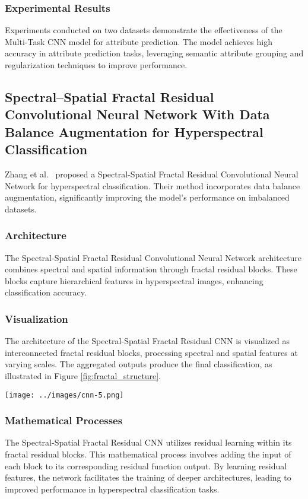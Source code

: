 \documentclass[journal, biblatex]{IEEEtran}
\begin{document}
\subsubsection{Experimental Results}
Experiments conducted on two datasets demonstrate the effectiveness of the Multi-Task CNN model for attribute prediction. The model achieves high accuracy in attribute prediction tasks, leveraging semantic attribute grouping and regularization techniques to improve performance.


\subsection{Spectral–Spatial Fractal Residual Convolutional Neural Network With Data Balance Augmentation for Hyperspectral Classification}
Zhang et al.~\cite{zhang2021} proposed a Spectral-Spatial Fractal Residual Convolutional Neural Network for hyperspectral classification. Their method incorporates data balance augmentation, significantly improving the model's performance on imbalanced datasets.

\subsubsection{Architecture}
The Spectral-Spatial Fractal Residual Convolutional Neural Network architecture combines spectral and spatial information through fractal residual blocks. These blocks capture hierarchical features in hyperspectral images, enhancing classification accuracy.

\subsubsection{Visualization}
The architecture of the Spectral-Spatial Fractal Residual CNN is visualized as interconnected fractal residual blocks, processing spectral and spatial features at varying scales. The aggregated outputs produce the final classification, as illustrated in Figure \ref{fig:fractal_structure}.

\begin{figure*}[htbp]
    \centering
    \texttt{[image: ../images/cnn-5.png]}
    \caption{Diagram of the spectral–spatial fractal structure.}
    \label{fig:fractal_structure}
\end{figure*}

\subsubsection{Mathematical Processes}
The Spectral-Spatial Fractal Residual CNN utilizes residual learning within its fractal residual blocks. This mathematical process involves adding the input of each block to its corresponding residual function output. By learning residual features, the network facilitates the training of deeper architectures, leading to improved performance in hyperspectral classification tasks.
\end{document}
